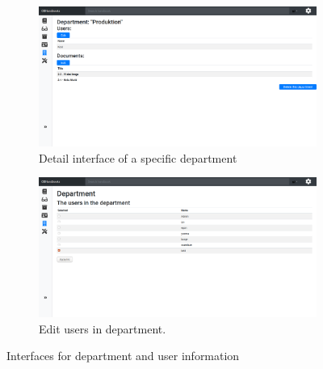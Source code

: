 \begin{figure}[H]\ContinuedFloat
	\centering
	\begin{subfigure}[b]{0.48\textwidth}
		\includegraphics[width=\textwidth]{billeder/iteration3Prototyper/Dep2.png}
		\caption{Detail interface of a specific department}
		\label{fig:5-Dep2}
	\end{subfigure}
	 \quad
 	\begin{subfigure}[b]{0.48\textwidth}
 		\includegraphics[width=\textwidth]{billeder/iteration3Prototyper/Dep3.png}
 		\caption{Edit users in department.}
 		\label{fig:5-Dep3}
 	\end{subfigure}
	\caption{Interfaces for department and user information}\label{fig:5-DepEditU}
\end{figure}
